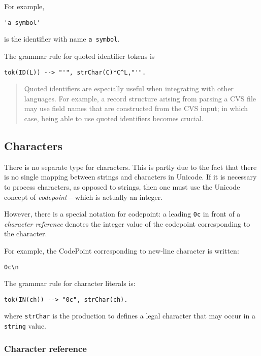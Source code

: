 For example,
\begin{verbatim}
'a symbol'
\end{verbatim}
is the identifier with name \verb+a symbol+.

The grammar rule for quoted identifier tokens is
\begin{verbatim}
tok(ID(L)) --> "'", strChar(C)*C^L,"'".
\end{verbatim}

\begin{quote}
Quoted identifiers are especially useful when integrating with other languages. For example, a record structure arising from parsing a CVS file may use field names that are constructed from the CVS input; in which case, being able to use quoted identifiers becomes crucial.
\end{quote}

\subsection{Characters}
\label{token:char}

There is no separate type for characters. This is partly due to the fact that there is no single mapping between strings and characters in Unicode. If it is necessary to process characters, as opposed to strings, then one must use the Unicode concept of \emph{codepoint} -- which is actually an integer.

However, there is a special notation for codepoint: a leading \verb+0c+ in front of a \emph{character reference} denotes the integer value of the codepoint corresponding to the character.

For example, the CodePoint corresponding to new-line character is written:
\begin{verbatim}
0c\n
\end{verbatim}

The grammar rule for character literals is:

\begin{verbatim}
tok(IN(ch)) --> "0c", strChar(ch).
\end{verbatim}
where \verb+strChar+ is the production to defines a legal character that may occur in a \verb+string+ value.

\subsubsection{Character reference}
\label{token:stringcharacter}
  
